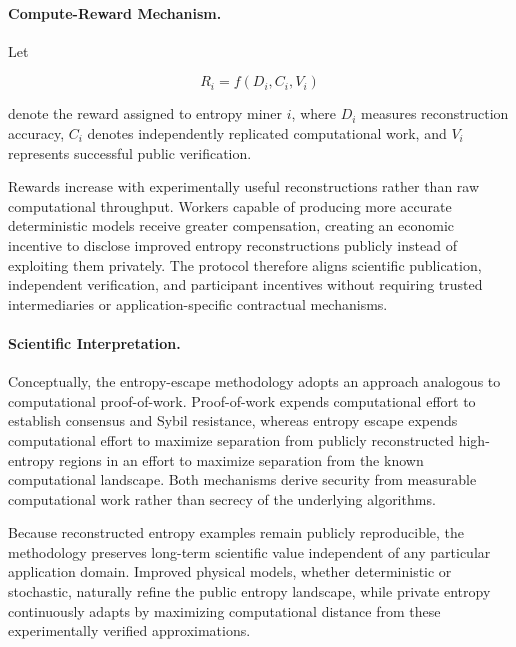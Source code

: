 \documentclass[11pt]{article}
\begin{document}

\paragraph{Compute-Reward Mechanism.}

Let

\[
R_i
=
f(D_i,C_i,V_i)
\]

denote the reward assigned to entropy miner $i$,
where $D_i$ measures reconstruction accuracy,
$C_i$ denotes independently replicated computational work,
and $V_i$ represents successful public verification.

Rewards increase with experimentally useful reconstructions rather than
raw computational throughput.
Workers capable of producing more accurate deterministic models receive
greater compensation,
creating an economic incentive to disclose improved entropy
reconstructions publicly instead of exploiting them privately.
The protocol therefore aligns scientific publication,
independent verification,
and participant incentives without requiring trusted intermediaries or
application-specific contractual mechanisms.


\paragraph{Scientific Interpretation.}

Conceptually, the entropy-escape methodology adopts an approach analogous to computational
proof-of-work\cite{bitcoin2008}.
Proof-of-work expends computational effort to establish consensus and
Sybil resistance,
whereas entropy escape expends computational effort to maximize
separation from publicly reconstructed high-entropy regions in an effort to maximize separation from the known computational landscape.
Both mechanisms derive security from measurable computational work
rather than secrecy of the underlying algorithms.

Because reconstructed entropy examples remain publicly reproducible,
the methodology preserves long-term scientific value independent of any
particular application domain.
Improved physical models,
whether deterministic or stochastic,
naturally refine the public entropy landscape,
while private entropy continuously adapts by maximizing computational
distance from these experimentally verified approximations.
\end{document}

